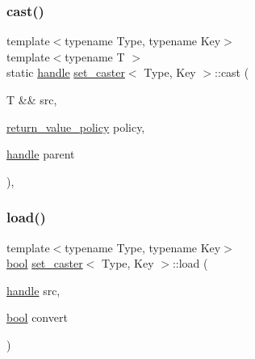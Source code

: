 \subsubsection{\texorpdfstring{cast()}{cast()}}
{\footnotesize\ttfamily template$<$typename Type, typename Key$>$ \\
template$<$typename T $>$ \\
static \mbox{\hyperlink{classhandle}{handle}} \mbox{\hyperlink{structset__caster}{set\+\_\+caster}}$<$ Type, Key $>$\+::cast (\begin{DoxyParamCaption}\item[{T \&\&}]{src,  }\item[{\mbox{\hyperlink{detail_2common_8h_adde72ab1fb0dd4b48a5232c349a53841}{return\+\_\+value\+\_\+policy}}}]{policy,  }\item[{\mbox{\hyperlink{classhandle}{handle}}}]{parent }\end{DoxyParamCaption})\hspace{0.3cm}{\ttfamily [inline]}, {\ttfamily [static]}}

\mbox{\label{structset__caster_ae10b8dc5a37d6e209bbcb94ce7b44c22}} 
\subsubsection{\texorpdfstring{load()}{load()}}
{\footnotesize\ttfamily template$<$typename Type, typename Key$>$ \\
\mbox{\hyperlink{asdl_8h_af6a258d8f3ee5206d682d799316314b1}{bool}} \mbox{\hyperlink{structset__caster}{set\+\_\+caster}}$<$ Type, Key $>$\+::load (\begin{DoxyParamCaption}\item[{\mbox{\hyperlink{classhandle}{handle}}}]{src,  }\item[{\mbox{\hyperlink{asdl_8h_af6a258d8f3ee5206d682d799316314b1}{bool}}}]{convert }\end{DoxyParamCaption})\hspace{0.3cm}{\ttfamily [inline]}}

\mbox{\label{structset__caster_ab0f145baeba1be7b712d8a9d4ee70812}} 
